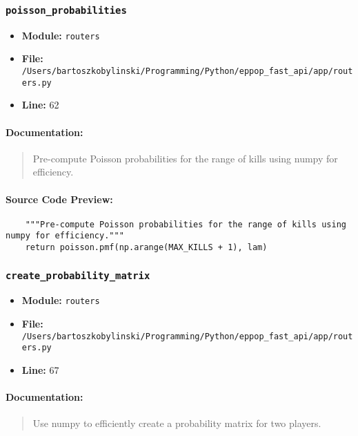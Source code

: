 \documentclass[11pt,a4paper]{article}
\begin{document}
\vspace{1em}
\subsubsection{\texttt{poisson\_probabilities}}

\begin{itemize}
    \item \textbf{Module:} \texttt{routers}
    \item \textbf{File:} \texttt{/Users/bartoszkobylinski/Programming/Python/eppop\_fast\_api/app/routers.py}
    \item \textbf{Line:} 62
\end{itemize}

\paragraph{Documentation:}
\begin{quote}
Pre-compute Poisson probabilities for the range of kills using numpy for efficiency.
\end{quote}

\paragraph{Source Code Preview:}
\begin{verbatim}
    """Pre-compute Poisson probabilities for the range of kills using numpy for efficiency."""
    return poisson.pmf(np.arange(MAX_KILLS + 1), lam)
\end{verbatim}

\vspace{1em}
\subsubsection{\texttt{create\_probability\_matrix}}

\begin{itemize}
    \item \textbf{Module:} \texttt{routers}
    \item \textbf{File:} \texttt{/Users/bartoszkobylinski/Programming/Python/eppop\_fast\_api/app/routers.py}
    \item \textbf{Line:} 67
\end{itemize}

\paragraph{Documentation:}
\begin{quote}
Use numpy to efficiently create a probability matrix for two players.
\end{quote}
\end{document}
